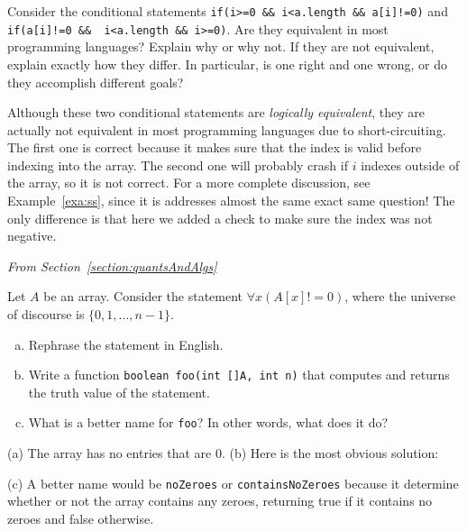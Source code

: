\begin{requ}
Consider the conditional statements 
\verb+if(i>=0 && i<a.length && a[i]!=0)+
and
 \verb+if(a[i]!=0 &&  i<a.length && i>=0)+. Are they equivalent in most programming languages?
 Explain why or why not.
If they are not equivalent, explain exactly how they differ. In particular, is one right and one
wrong, or do they accomplish different goals?
\begin{requanswer}
Although these two conditional statements are 
{\em logically equivalent}, they are actually not equivalent
in most programming languages due to short-circuiting. 
The first one is correct because it makes sure
that the index is valid before indexing into the array. 
The second one will probably crash if $i$ indexes outside of the array, so it is not correct.
For a more complete discussion, see Example~\ref{exa:ss}, since
it is addresses almost the same exact same question! 
The only difference is that here we added a check to make sure the
index was not negative.
\end{requanswer}
\end{requ}

\medskip

\noindent
{\em From Section~\ref{section:quantsAndAlgs}}

\begin{requ}\label{rq:fooBeforeBar}
Let $A$ be an array. Consider the statement $\forall x (A[x]!=0)$,
where the universe of discourse is $\{0,1,\ldots, n-1\}$.
\begin{enumerate}[(a)]
\item
Rephrase the statement in English.
\item
Write a function \verb+boolean foo(int []A, int n)+ 
that computes and returns the truth value of the statement.
\item
What is a better name for \verb+foo+? In other words, what does it do?
\end{enumerate}
\begin{requanswer}
(a) The array has no entries that are 0.
(b) Here is the most obvious solution:
\begin{code}
boolean foo(int []A, int n)
    for (int i = 0; i < n; i++) {
        if(a[i] == 0) {
            return false;  
        }
    }
    return true; 
}
\end{code}
(c) A better name would be \verb+noZeroes+ or \verb+containsNoZeroes+
because it determine whether or not the array contains any zeroes, returning true if it contains no zeroes and 
false otherwise.
\end{requanswer}
\end{requ}


